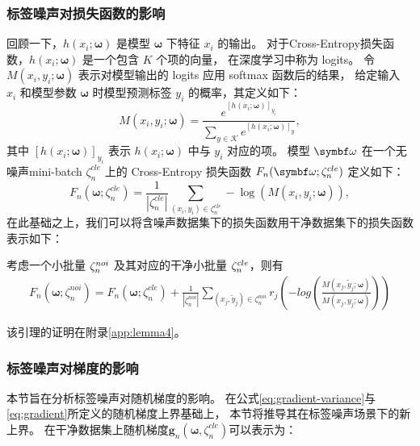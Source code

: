\subsubsection{标签噪声对损失函数的影响}
回顾一下，$h\left(x_i;\boldsymbol{\omega}\right)$ 是模型 $\boldsymbol{\omega}$ 下特征 $x_i$ 的输出。
对于Cross-Entropy损失函数，$h\left(x_i;\boldsymbol{\omega}\right)$ 是一个包含 $K$ 个项的向量，
在深度学习中称为 logits。
令 $ M(x_i, {y}_i; \boldsymbol{\omega}) $ 表示对模型输出的 logits 应用 softmax 函数后的结果，
给定输入 $x_i$ 和模型参数 $\boldsymbol{\omega}$ 时模型预测标签 $y_i$ 的概率，其定义如下：
\begin{equation}\label{eq:cross}
    M(x_i, {y}_i; \boldsymbol{\omega})= \frac{e^{[h\left(x_i;\boldsymbol{\omega}\right)]_{{y}_i}}}{\sum_{{y}\in\mathcal{K}}e^{[h\left(x_i;\boldsymbol{\omega}\right)]_{{y}}}},
\end{equation}
其中 $[h\left(x_i;\boldsymbol{\omega}\right)]_{{y}_i}$ 表示 $h\left(x_i;\boldsymbol{\omega}\right)$ 中与 ${y}_i$ 对应的项。
模型 $\omegab$ 在一个无噪声mini-batch $\zeta_n^{cle}$ 上的 Cross-Entropy 损失函数 $F_{n}(\omegab;\zeta_n^{cle})$ 定义如下：
\begin{equation}\label{eq:cross-entropy}
F_n\left(\boldsymbol{\omega};\zeta_n^{cle}\right)=\frac{1}{|\zeta_n^{cle}|}\sum_{\left(x_i,y_i\right)\in \zeta_n^{cle}}-\log\left(M(x_i, {y}_i; \boldsymbol{\omega})\right),
\end{equation}
在此基础之上，我们可以将含噪声数据集下的损失函数用干净数据集下的损失函数表示如下：
\begin{lemma}\label{lem:cross}
考虑一个小批量 $\zeta^{noi}_n$ 及其对应的干净小批量 $\zeta^{cle}_n$，则有
\begin{multline}
F_n\left(\boldsymbol{\omega};\zeta_n^{noi}\right)=F_n\left(\boldsymbol{\omega};\zeta_n^{cle}\right)+\frac{1}{|\zeta_n^{noi}|}\sum_{\left(x_j,\tilde{y}_j\right)\in \zeta_n^{noi}}r_j\left(-log\left(\frac{M\left(x_j, \tilde{y}_j; \boldsymbol{\omega}\right)}{M\left(x_j, y_j; \boldsymbol{\omega}\right)}\right)\right)
\end{multline}
\end{lemma}
该引理的证明在附录\ref{app:lemma4}。

\subsubsection{标签噪声对梯度的影响}
本节旨在分析标签噪声对随机梯度的影响。
在公式\eqref{eq:gradient-variance}与\eqref{eq:gradient}所定义的随机梯度上界基础上，
本节将推导其在标签噪声场景下的新上界。
在干净数据集上随机梯度$\boldsymbol{g}_n\left(\boldsymbol{\omega},\zeta_n^{cle}\right)$可以表示为：

